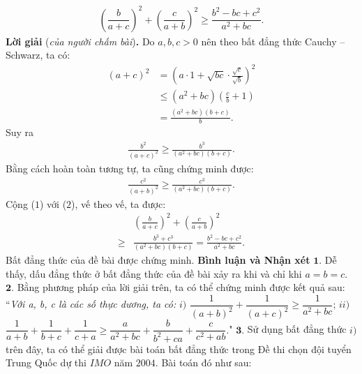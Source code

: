 \begin{multicols}{2}
\begin{align*}
		\left(\dfrac b{a+c}\right)^2+\left(\dfrac{c}{a+b}\right)^2\ge \dfrac{b^2-bc+c^2}{a^2+bc}.
	\end{align*}
	\textbf{\color{thachthuctoanhoc}Lời giải} (\textit{của người chấm bài})\textbf{\color{thachthuctoanhoc}.}
	\vskip 0.05cm
	Do $a, b, c > 0$ nên theo bất đẳng thức Cauchy -- Schwarz, ta có:
	\begin{align*}
		{\left( {a + c} \right)^2} &= {\left( {a \cdot 1 + \sqrt {bc}  \cdot \frac{{\sqrt c }}{{\sqrt b }}} \right)^2} \\
		&\le \left( {{a^2} + bc} \right)\left( {\frac{c}{b} + 1} \right) \\
		&= \frac{{\left( {{a^2} + bc} \right)\left( {b + c} \right)}}{b}.
	\end{align*}
	Suy ra
	\begin{align*}
		\frac{{{b^2}}}{{{{\left( {a + c} \right)}^2}}} \ge \frac{{{b^3}}}{{\left( {{a^2} + bc} \right)\left( {b + c} \right)}}. \tag{$1$}
	\end{align*}
	Bằng cách hoàn toàn tương tự, ta cũng chứng minh được:
	\begin{align*}
		\frac{{{c^2}}}{{{{\left( {a + b} \right)}^2}}} \ge \frac{{{c^3}}}{{\left( {{a^2} + bc} \right)\left( {b + c} \right)}}. \tag{$2$}
	\end{align*}
	Cộng ($1$) với ($2$), vế theo vế, ta được:
	\begin{align*}
		&{\left( {\frac{b}{{a + c}}} \right)^2} + {\left( {\frac{c}{{a + b}}} \right)^2} \\
		\ge &\frac{{{b^3} + {c^3}}}{{\left( {{a^2} + bc} \right)\left( {b + c} \right)}} = \frac{{{b^2} - bc + {c^2}}}{{{a^2} + bc}}.
	\end{align*}
	Bất đẳng thức của đề bài được chứng minh.
	\vskip 0.05cm
	\textbf{\color{thachthuctoanhoc}Bình luận và Nhận xét}
	\vskip 0.05cm
	$\pmb{1.}$ Dễ thấy, dấu đẳng thức ở bất đẳng thức của đề bài xảy ra khi và chỉ khi $a = b = c$.
	\vskip 0.05cm
	$\pmb{2.}$ Bằng phương pháp của lời giải trên, ta có thể chứng minh được kết quả sau:
	\vskip 0.05cm
	``\textit{Với a, b, c là các số thực dương, ta có:}
	\vskip 0.05cm
	$i)$  $\dfrac{1}{{{{\left( {a + b} \right)}^2}}} + \dfrac{1}{{{{\left( {a + c} \right)}^2}}} \ge \dfrac{1}{{{a^2} + bc}}$;
	\vskip 0.05cm
	$ii)$  $\dfrac{1}{{a + b}} + \dfrac{1}{{b + c}} + \dfrac{1}{{c + a}} \ge \dfrac{a}{{{a^2} + bc}} + \dfrac{b}{{{b^2} + ca}} + \dfrac{c}{{{c^2} + ab}}.$"
	\vskip 0.05cm
	$\pmb{3.}$ Sử dụng bất đẳng thức $i)$ trên đây, ta có thể giải được bài toán bất đẳng thức trong Đề thi chọn đội tuyển Trung Quốc dự thi $IMO$ năm $2004$. Bài toán đó như sau:

\end{multicols}
